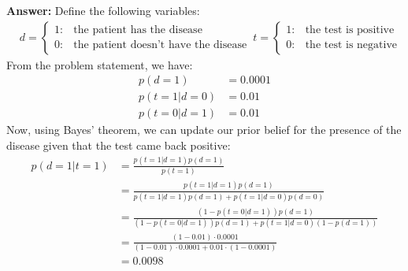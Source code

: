 \documentclass{article}
\newenvironment{QandA}{\begin{enumerate}[label=\arabic*.]}{\end{enumerate}}
\newenvironment{InnerQandA}{\begin{enumerate}[label=\roman*.]}{\end{enumerate}}
\newenvironment{answer}{\par\normalfont \textbf{Answer:}}{}
\newcommand{\g}{\vert}
\begin{document}
\begin{QandA}
\begin{InnerQandA}
\begin{answer}
            Define the following variables:
            \begin{align*}
                &d = \begin{cases}
                    1: &\text{the patient has the disease} \\
                    0: &\text{the patient doesn't have the disease}
                \end{cases}
                &t = \begin{cases}
                    1: &\text{the test is positive} \\
                    0: &\text{the test is negative}
                \end{cases}
            \end{align*}
            From the problem statement, we have:
            \begin{align*}
                p(d=1) &= 0.0001 \\
                p(t=1 \g d = 0) &= 0.01 \\
                p(t=0 \g d = 1) &= 0.01
            \end{align*}
            Now, using Bayes' theorem, we can update our prior belief for the presence of the disease given that the test came back positive:
            \begin{align*}
                p(d = 1 \g t = 1) &= \frac{p(t=1 \g d = 1) p(d = 1)}{p (t = 1)} \\
                &= \frac{p(t=1 \g d = 1) p(d = 1)}{p(t=1 \g d = 1) p(d = 1) + p(t=1 \g d = 0) p(d = 0)} \\
                &= \frac{(1-p(t=0 \g d = 1)) p(d = 1)}{(1-p(t=0 \g d = 1)) p(d = 1) + p(t=1 \g d = 0) (1-p(d = 1))} \\
                &= \frac{(1-0.01) \cdot 0.0001}{(1 - 0.01)\cdot 0.0001 + 0.01 \cdot (1-0.0001)} \\
                &= 0.0098
            \end{align*}
        \end{answer}


\end{InnerQandA}
\end{QandA}
\end{document}
